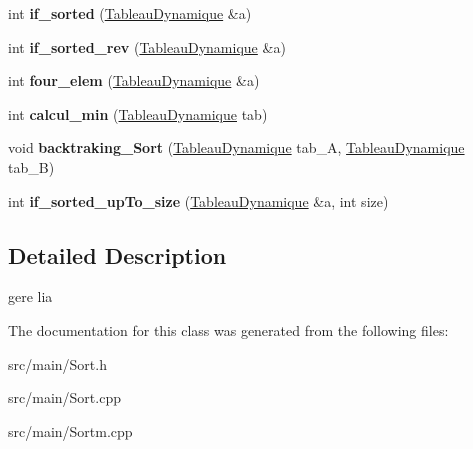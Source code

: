 \begin{DoxyCompactItemize}
\item 
int {\bfseries if\+\_\+sorted} (\hyperlink{classTableauDynamique}{Tableau\+Dynamique} \&a)\hypertarget{classSort_a545d3fc84e0eed5e7e2d5bbcf47d28c0}{}\label{classSort_a545d3fc84e0eed5e7e2d5bbcf47d28c0}

\item 
int {\bfseries if\+\_\+sorted\+\_\+rev} (\hyperlink{classTableauDynamique}{Tableau\+Dynamique} \&a)\hypertarget{classSort_ace0622f149cbfd03ef1caf6d88e42b3f}{}\label{classSort_ace0622f149cbfd03ef1caf6d88e42b3f}

\item 
int {\bfseries four\+\_\+elem} (\hyperlink{classTableauDynamique}{Tableau\+Dynamique} \&a)\hypertarget{classSort_a843a79eed52ccbfcdc85186755526b16}{}\label{classSort_a843a79eed52ccbfcdc85186755526b16}

\item 
int {\bfseries calcul\+\_\+min} (\hyperlink{classTableauDynamique}{Tableau\+Dynamique} tab)\hypertarget{classSort_a5b978f3b8ad1c74ef196f2a42a50863b}{}\label{classSort_a5b978f3b8ad1c74ef196f2a42a50863b}

\item 
void {\bfseries backtraking\+\_\+\+Sort} (\hyperlink{classTableauDynamique}{Tableau\+Dynamique} tab\+\_\+A, \hyperlink{classTableauDynamique}{Tableau\+Dynamique} tab\+\_\+B)\hypertarget{classSort_ab9b07a53ab22e3f086bf57334016bd56}{}\label{classSort_ab9b07a53ab22e3f086bf57334016bd56}

\item 
int {\bfseries if\+\_\+sorted\+\_\+up\+To\+\_\+size} (\hyperlink{classTableauDynamique}{Tableau\+Dynamique} \&a, int size)\hypertarget{classSort_a9c3484197e53a79e34f60cfa59564981}{}\label{classSort_a9c3484197e53a79e34f60cfa59564981}

\end{DoxyCompactItemize}


\subsection{Detailed Description}
gere l\textquotesingle{}ia 

The documentation for this class was generated from the following files\+:\begin{DoxyCompactItemize}
\item 
src/main/Sort.\+h\item 
src/main/Sort.\+cpp\item 
src/main/Sortm.\+cpp\end{DoxyCompactItemize}
